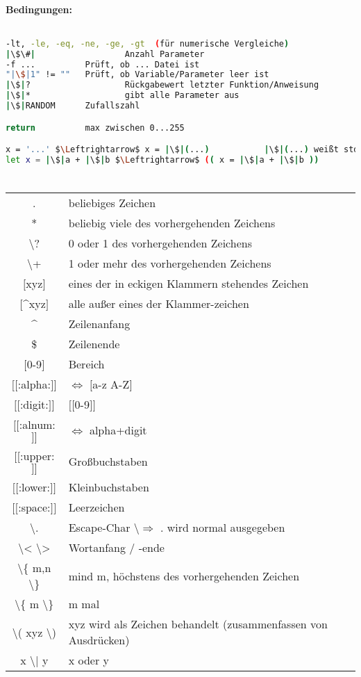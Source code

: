\paragraph{Bedingungen:} $ $
\begin{lstlisting}[language=bash]
-lt, -le, -eq, -ne, -ge, -gt  (für numerische Vergleiche)
|\$\#|					Anzahl Parameter
-f ...			Prüft, ob ... Datei ist
"|\$|1" != ""	Prüft, ob Variable/Parameter leer ist
|\$|?					Rückgabewert letzter Funktion/Anweisung
|\$|*					gibt alle Parameter aus
|\$|RANDOM		Zufallszahl

return			max zwischen 0...255

x = '...' $\Leftrightarrow$ x = |\$|(...)			|\$|(...) weißt stdout einer Fkt einer Variablen zu
let x = |\$|a + |\$|b $\Leftrightarrow$ (( x = |\$|a + |\$|b ))
\end{lstlisting}

\section[Regex]{}
\begin{tabular}{c l}
. & beliebiges Zeichen\\
* & beliebig viele des vorhergehenden Zeichens\\
\textbackslash ? & 0 oder 1 des vorhergehenden Zeichens\\
\textbackslash + & 1 oder mehr des vorhergehenden Zeichens\\
$[$xyz$]$ & eines der in eckigen Klammern stehendes Zeichen\\
$[$\^{}xyz$]$ & alle außer eines der Klammer-zeichen\\
\^{} & Zeilenanfang\\
\$ & Zeilenende\\
$[$0-9$]$ & Bereich\\
$[[$:alpha:$]]$ & $\Leftrightarrow$ $[$a-z A-Z$]$\\
$[[$:digit:$]]$ & $[[$0-9$]]$\\
$[[$:alnum:$]]$ & $\Leftrightarrow$ alpha+digit\\
$[[$:upper:$]]$ & Großbuchstaben\\
$[[$:lower:$]]$ & Kleinbuchstaben\\
$[[$:space:$]]$ & Leerzeichen\\
\textbackslash . & Escape-Char \textbackslash $\Rightarrow$ . wird normal ausgegeben\\
\textbackslash < \textbackslash > & Wortanfang / -ende\\
\textbackslash \{ m,n \textbackslash \} & mind m, höchstens des vorhergehenden Zeichen\\
\textbackslash \{ m \textbackslash \} & m mal\\
\textbackslash ( xyz \textbackslash ) & xyz wird als Zeichen behandelt (zusammenfassen von Ausdrücken)\\
x \textbackslash | y & x oder y\\
\end{tabular}

